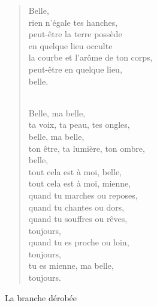 \documentclass[11pt,a4paper]{book}
\begin{document}
\begin{verse}
\newpage

Belle, \\
rien n'égale tes hanches, \\
peut-être la terre possède \\
en quelque lieu occulte \\
la courbe et l'arôme de ton corps, \\
peut-être en quelque lieu, \\
belle. \\ \

Belle, ma belle, \\
ta voix, ta peau, tes ongles, \\
belle, ma belle, \\
ton être, ta lumière, ton ombre, \\
belle, \\
tout cela est à moi, belle, \\
tout cela est à moi, mienne, \\
quand tu marches ou reposes, \\
quand tu chantes ou dors, \\
quand tu souffres ou rêves, \\
toujours, \\
quand tu es proche ou loin, \\
toujours, \\
tu es mienne, ma belle, \\
toujours.
\end{verse}

\newpage

{\huge La branche dérobée} \\ \\
\end{document}
